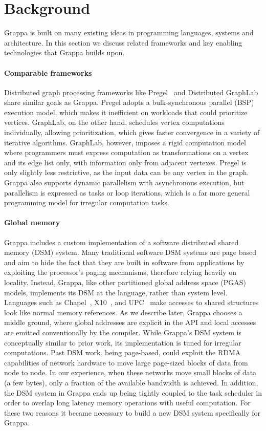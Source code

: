 \section{Background}

Grappa is built on many existing ideas in programming languages, systems and
architecture. In this section we discuss related frameworks and key enabling
technologies that Grappa builds upon.

\paragraph{Comparable frameworks} Distributed graph processing
frameworks like Pregel~\cite{pregel:2010} and Distributed
GraphLab~\cite{distgraphlab:vldb12} share similar goals as
Grappa. Pregel adopts a bulk-synchronous parallel (BSP) execution
model, which makes it inefficient on workloads that could prioritize
vertices. GraphLab, on the other hand, schedules vertex computations
individually, allowing prioritization, which gives faster convergence
in a variety of iterative algorithms.  GraphLab, however, imposes a
rigid computation model where programmers must express computation as
transformations on a vertex and its edge list only, with information only
from adjacent vertexes. Pregel is only slightly less
restrictive, as the input data can be any vertex in the graph.  Grappa
also supports dynamic parallelism with asynchronous execution, but
parallelism is expressed as tasks or loop iterations, which is a far
more general programming model for irregular computation tasks.

\paragraph{Global memory} Grappa includes a custom implementation of a
software distributed shared memory (DSM) system. Many traditional
software DSM systems are page based~\cite{Treadmarks,munin} and aim to
hide the fact that they are built in software from applications by
exploiting the processor's paging mechanisms, therefore relying
heavily on locality. Instead, Grappa, like other partitioned global
address space (PGAS) models, implements its DSM at the language,
rather than system level. Languages such as
Chapel~\cite{Chamberlain:2007}, X10~\cite{X10:2005}, and
UPC~\cite{upc:2005} make accesses to shared structures look like
normal memory references. As we describe later, Grappa chooses a
middle ground, where global addresses are explicit in the API and
local accesses are emitted conventionally by the compiler.  While
Grappa's DSM system is conceptually similar to prior work, its
implementation is tuned for irregular computations.  Past DSM work,
being page-based, could exploit the RDMA capabilities of network
hardware to move large page-sized blocks of data from node to node.
In our experience, when these networks move small blocks of data (a
few bytes), only a fraction of the available bandwidth is achieved.
In addition, the DSM system in Grappa ends up being tightly coupled to
the task scheduler in order to overlap long latency memory operations
with useful computation.  For these two reasons it became necessary to
build a new DSM system specifically for Grappa.


